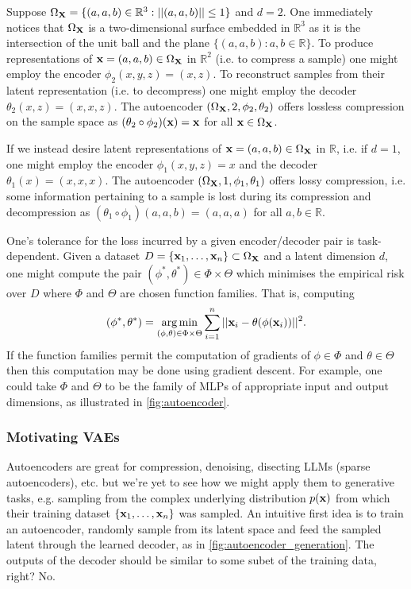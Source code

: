 \documentclass[11pt]{article}
\begin{document}
\begin{example}
    Suppose $\Omega_{\mathbf{X}}=\{(a,a,b)\in\mathbb{R}^3:||(a,a,b)||\leq1\}$ and $d=2$. One immediately notices that $\Omega_{\mathbf{X}}$ is a two-dimensional surface embedded in $\mathbb{R}^3$ as it is the intersection of the unit ball and the plane $\{(a,a,b):a,b\in\mathbb{R}\}$. To produce representations of $\mathbf{x}=(a,a,b)\in\Omega_{\mathbf{X}}$ in $\mathbb{R}^2$ (i.e. to compress a sample) one might employ the encoder $\phi_2(x,y,z)=(x,z)$. To reconstruct samples from their latent representation (i.e. to decompress) one might employ the decoder $\theta_2(x,z)=(x,x,z)$. The autoencoder $(\Omega_{\mathbf{X}},2,\phi_2,\theta_2)$ offers lossless compression on the sample space as $(\theta_2\circ\phi_2)(\mathbf{x})=\mathbf{x}$ for all $\mathbf{x}\in\Omega_{\mathbf{X}}$.
    
    \hspace{15pt} If we instead desire latent representations of $\mathbf{x}=(a,a,b)\in\Omega_{\mathbf{X}}$ in $\mathbb{R}$, i.e. if $d=1$, one might employ the encoder $\phi_1(x,y,z)=x$ and the decoder $\theta_1(x)=(x,x,x)$. The autoencoder $(\Omega_{\mathbf{X}},1,\phi_1,\theta_1)$ offers lossy compression, i.e. some information pertaining to a sample is lost during its compression and decompression as $(\theta_1\circ\phi_1)(a,a,b)=(a,a,a)$ for all $a,b\in\mathbb{R}$.
\end{example}

One's tolerance for the loss incurred by a given encoder/decoder pair is task-dependent. Given a dataset $D=\{\mathbf{x}_1,\dots,\mathbf{x}_n\}\subset\Omega_{\mathbf{X}}$ and a latent dimension $d$, one might compute the pair $(\phi^*,\theta^*)\in\Phi\times\Theta$ which minimises the empirical risk over $D$ where $\Phi$ and $\Theta$ are chosen function families. That is, computing
$$
(\phi^*,\theta^*)
=
\operatorname*{arg\,min}_{(\phi,\theta)\in\Phi\times\Theta}
\sum_{i=1}^n||\mathbf{x}_i-\theta(\phi(\mathbf{x}_i))||^2.
$$
If the function families permit the computation of gradients of $\phi\in\Phi$ and $\theta\in\Theta$ then this computation may be done using gradient descent. For example, one could take $\Phi$ and $\Theta$ to be the family of MLPs of appropriate input and output dimensions, as illustrated in \autoref{fig:autoencoder}.

\subsubsection{Motivating VAEs}
Autoencoders are great for compression, denoising, disecting LLMs (sparse autoencoders), etc. but we're yet to see how we might apply them to generative tasks, e.g. sampling from the complex underlying distribution $p(\mathbf{x})$ from which their training dataset $\{\mathbf{x}_1,\dots,\mathbf{x}_n\}$ was sampled. An intuitive first idea is to train an autoencoder, randomly sample from its latent space and feed the sampled latent through the learned decoder, as in \autoref{fig:autoencoder_generation}. The outputs of the decoder should be similar to some subet of the training data, right? No.
\end{document}
